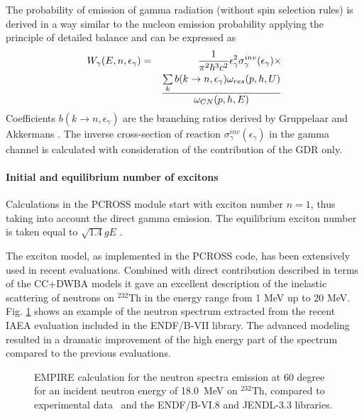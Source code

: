 The probability of emission of gamma radiation (without spin selection
rules) is derived in a way similar to the nucleon emission probability
applying the principle of detailed balance \cite%
{plpr78,Betak:79,Akkermans:85} and can be expressed as%
\begin{eqnarray}
W_{\gamma }(E,n,\epsilon _{\gamma })&=&\frac{1}{\pi ^{2}\hbar ^{3}c^{2}}%
\epsilon _{\gamma }^{2}\sigma _{\gamma }^{inv}(\epsilon _{\gamma })\times
\notag \\
&&\frac{\sum\limits_{k}b(k\rightarrow n,\epsilon _{\gamma })\omega
_{res}(p,h,U)}{\omega _{CN}(p,h,E)}
\end{eqnarray}%
Coefficients $b(k\rightarrow n,\epsilon _{\gamma })$ are the branching
ratios derived by Gruppelaar and Akkermans \cite{Akkermans:85}. The inverse
cross-section of reaction $\sigma _{\gamma }^{inv}(\epsilon _{\gamma })$ in
the gamma channel is calculated with consideration of the contribution of
the GDR only.

\paragraph{Initial and equilibrium number of excitons}

Calculations in the PCROSS module start with exciton number $n=1$, thus
taking into account the direct gamma emission. The equilibrium exciton
number is taken equal to $\sqrt{1.4}gE$ \cite{Shang:88,Shang:89}.

\bigskip


The exciton model, as implemented in the PCROSS code, has been extensively
used in recent evaluations. Combined with direct
contribution described in terms of the CC+DWBA models it gave an excellent description of the inelastic scattering of neutrons on $^{232}$Th in the energy range from 1 MeV up to 20 MeV. Fig. \ref{thspectra} shows an example of the neutron spectrum extracted from the recent IAEA evaluation included in the ENDF/B-VII library. The advanced modeling resulted in a dramatic improvement of the high energy part of the spectrum compared to the previous evaluations.

\begin{figure}[htbp]
\caption{EMPIRE calculation for the neutron spectra emission at 60 degree
for an incident neutron energy of 18.0~MeV on $^{232}$Th, compared to
experimental data~\protect\cite{mats} and the ENDF/B-VI.8 and JENDL-3.3
libraries.}
\label{thspectra}
\end{figure}

